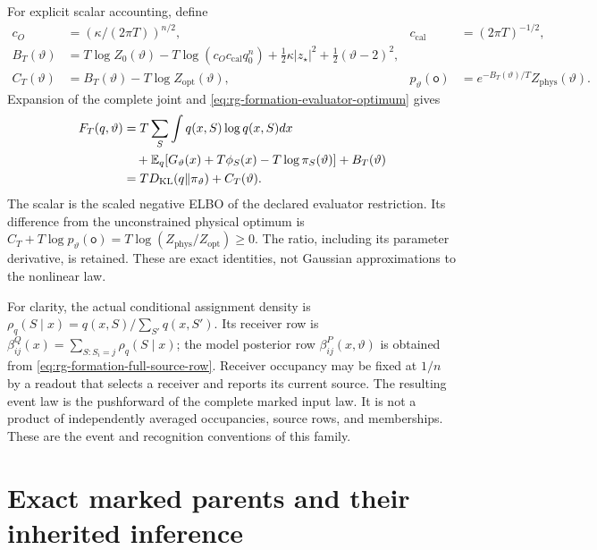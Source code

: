 For explicit scalar accounting, define
\begin{equation}
\begin{aligned}
c_O&=(\kappa/(2\pi T))^{n/2},&
c_{\mathrm{cal}}&=(2\pi T)^{-1/2},\\
B_T(\vartheta)
 &=T\log Z_0(\vartheta)-T\log(c_Oc_{\mathrm{cal}}q_0^n)
   +\tfrac12\kappa|z_\star|^2+\tfrac12(\vartheta-2)^2,\\
C_T(\vartheta)&=B_T(\vartheta)-T\log Z_{\mathrm{opt}}(\vartheta),&
p_\vartheta(\mathsf o)&=e^{-B_T(\vartheta)/T}
                         Z_{\mathrm{phys}}(\vartheta).
\end{aligned}
\label{eq:rg-formation-evidence-scalar}
\end{equation}
Expansion of the complete joint and
\cref{eq:rg-formation-evaluator-optimum} gives
\begin{equation}
\begin{aligned}
F_T(q,\vartheta)
 &=T\sum_S\int q(x,S)\log q(x,S)dx\\
 &\quad+\mathbb E_q[
       G_\vartheta(x)+T\phi_S(x)-T\log\pi_S(\vartheta)]
       +B_T(\vartheta)\\
 &=TD_{\mathrm{KL}}(q\Vert\pi_\vartheta)+C_T(\vartheta).
\end{aligned}
\label{eq:rg-formation-restricted-vfe}
\end{equation}
The scalar is the scaled negative ELBO of the declared evaluator
restriction. Its difference from the unconstrained physical optimum is
\(C_T+T\log p_\vartheta(\mathsf o)
=T\log(Z_{\mathrm{phys}}/Z_{\mathrm{opt}})\ge0\).
The ratio, including its parameter derivative, is retained. These are
exact identities, not Gaussian approximations to the nonlinear law.

For clarity, the actual conditional assignment density is
\(\rho_q(S\mid x)=q(x,S)/\sum_{S'}q(x,S')\). Its receiver row is
\(\beta^Q_{ij}(x)=\sum_{S:S_i=j}\rho_q(S\mid x)\); the model posterior
row \(\beta^P_{ij}(x,\vartheta)\) is obtained from
\cref{eq:rg-formation-full-source-row}. Receiver occupancy may be fixed
at \(1/n\) by a readout that selects a receiver and reports its current
source. The resulting event law is the pushforward of the complete
marked input law. It is not a product of independently averaged
occupancies, source rows, and memberships. These are the event and
recognition conventions of this family. 

\section{Exact marked parents and their inherited inference}
\label{sec:rg-formation-parents}

